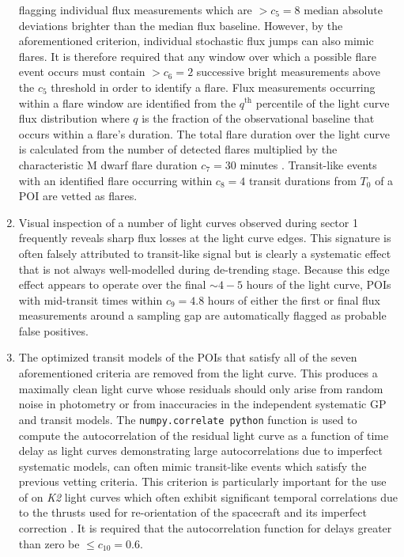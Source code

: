 \begin{enumerate}
  flagging individual flux measurements which are $>c_5=8$ median absolute deviations brighter than the
  median flux baseline. However, by the aforementioned criterion, individual stochastic flux jumps can also
  mimic flares. It is therefore required that any window over which a possible flare event occurs must contain
  $>c_6=2$ successive bright measurements above the $c_5$ threshold in order to identify a flare.
  Flux measurements occurring within a flare window are identified from the $q^{\text{th}}$ percentile
  of the light curve flux distribution where $q$ is the fraction of the observational baseline
  that occurs within a flare's duration. The total flare duration over the light curve is calculated from the
  number of detected flares multiplied by the characteristic M dwarf flare duration $c_7=30$ minutes
  \citep{moffett74,walkowicz11,hawley14}. Transit-like
  events with an identified flare occurring within $c_8=4$ transit durations from $T_0$ of a POI are vetted as
  flares.
\item Visual inspection of a number of light curves observed during sector 1 frequently reveals sharp
  flux losses at the light curve edges. This signature is often falsely attributed to transit-like
  signal but is clearly a systematic effect that is not always well-modelled during de-trending stage.
  Because this edge effect appears to operate over the final $\sim 4-5$ hours of the light curve,
  POIs with mid-transit times within $c_9=4.8$ hours of either the first or final flux measurements around
  a sampling gap are automatically flagged as probable false positives.
\item The optimized transit models of the POIs that satisfy all of the seven aforementioned criteria are
  removed from the light curve. This produces a maximally clean light curve whose residuals should only
  arise from random noise in photometry or from inaccuracies in the independent systematic GP and transit
  models. The \texttt{numpy.correlate python} function is used to compute the autocorrelation of the
  residual light curve as a function of time delay as light curves demonstrating large autocorrelations
  due to imperfect systematic models, can often mimic transit-like events which satisfy
  the previous vetting criteria. This criterion is particularly important for the use of \pipeline{} on
  \emph{K2} light curves which often exhibit significant temporal correlations due to the thrusts used for
  re-orientation of the spacecraft and its imperfect correction \citep{vanderburg14}. It is required that
  the autocorrelation function for delays greater than zero be $\leq c_{10}=0.6$.
\end{enumerate}


